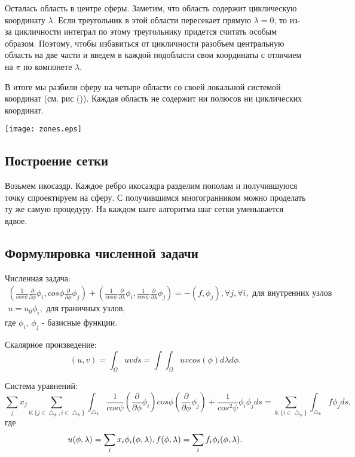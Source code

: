 \documentclass[a4paper]{article}
\begin{document}
Осталась область в центре сферы. Заметим, что область содержит
циклическую координату $\lambda$. Если треугольник в этой области
пересекает прямую $\lambda=0$, то из-за цикличности интеграл по этому
треугольнику придется считать особым образом. Поэтому, чтобы
избавиться от цикличности разобъем центральную область на две части и
введем в каждой подобласти свои координаты с отличием на $\pi$ по
компонете $\lambda$.

В итоге мы разбили сферу на четыре области со своей локальной системой
координат (см. рис ()). Каждая область не содержит ни полюсов ни
циклических координат.

\begin{center}
\texttt{[image: zones.eps]}
\end{center} 

\subsection*{Построение сетки}
Возьмем икосаэдр. Каждое ребро икосаэдра разделим пополам и
получившуюся точку спроектируем на сферу. С получившимся
многогранником можно проделать ту же самую процедуру. На каждом шаге
алгоритма шаг сетки уменьшается вдвое. 

\subsection*{Формулировка численной задачи}
Численная задача:
\begin{equation*}
\begin{split}
(\frac{1}{cos\psi}\frac{\partial}{\partial \phi} \phi_i, cos\phi
  \frac{\partial}{\partial \phi} \phi_j) 
+(\frac{1}{cos\psi}\frac{\partial}{\partial \lambda}\phi_i,
\frac{1}{cos\psi}\frac{\partial}{\partial \lambda}\phi_j ) = -(f,
\phi_j), \forall j, \forall i, \text{ для внутренних узлов } \\ 
u = u_0 \phi_i, \text { для граничных узлов, }
\end{split}
\end{equation*}
где $\phi_i$, $\phi_j$ - базисные функции.

Скалярное произведение:
\begin{equation*}
(u, v) = \int_\Omega u v ds = \int\int_\Omega u v cos(\phi)d\lambda d\phi.
\end{equation*}

Система уравнений:
\begin{equation*}
\sum_j x_j \sum_{k: \{j\in\bigtriangleup_k,
  i\in\bigtriangleup_k\}}\int_{\bigtriangleup_k}\frac{1}{cos\psi}(\frac{\partial}{\partial
  \phi} \phi_i) cos\phi (\frac{\partial}{\partial \phi}
\phi_j)+\frac{1}{cos^2\psi}\phi_i\phi_j ds =
\sum_{k:\{i\in\bigtriangleup_k\}}\int_{\bigtriangleup_k}f \phi_j ds, 
\end{equation*}
где
\begin{equation*}
u(\phi,\lambda)=\sum_i x_i \phi_i(\phi, \lambda),\\
f(\phi,\lambda)=\sum_i f_i \phi_i(\phi, \lambda).
\end{equation*}
\end{document}
